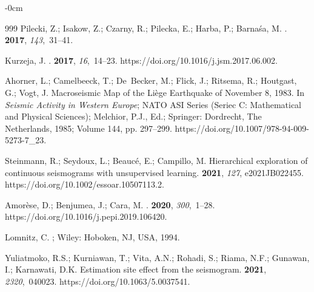 \documentclass[sensors,article,accept,moreauthors,pdftex]{Definitions/mdpi}
\begin{document}
\begin{adjustwidth}{-\extralength}{0cm}
\begin{thebibliography}{999}
Pilecki, Z.; Isakow, Z.; Czarny, R.; Pilecka, E.; Harba, P.; Barnaśa, M.
.
 {\bf 2017}, {\em 143},~31--41.

Kurzeja, J.
.
 {\bf 2017}, {\em 16},~14--23.
\newblock
  {https://doi.org/10.1016/j.jsm.2017.06.002}.

Ahorner, L.; Camelbeeck, T.; De~Becker, M.; Flick, J.; Ritsema, R.; Houtgast,
  G.; Vogt, J.
\newblock Macroseismic Map of the Liège Earthquake of November 8, 1983. In
  {\em Seismic Activity in Western Europe}; NATO ASI Series (Seriec C:
  Mathematical and Physical Sciences); Melchior, P.J., Ed.; Springer:
  Dordrecht, The Netherlands,  1985; Volume 144, pp. 297--299.
\newblock
{https://doi.org/10.1007/978-94-009-5273-7\_23}.

Steinmann, R.; Seydoux, L.; Beaucé, E.; Campillo, M.
\newblock Hierarchical exploration of continuous seismograms with unsupervised
  learning.
 {\bf 2021}, \emph{127}, e2021JB022455. %
\newblock
{https://doi.org/10.1002/essoar.10507113.2}.

Amorèse, D.; Benjumea, J.; Cara, M.
.
 {\bf 2020}, {\em
  300},~1--28.
\newblock
{https://doi.org/10.1016/j.pepi.2019.106420}.

Lomnitz, C.
; Wiley: Hoboken, NJ, USA, %
  1994.

Yuliatmoko, R.S.; Kurniawan, T.; Vita, A.N.; Rohadi, S.; Riama, N.F.; Gunawan,
  I.; Karnawati, D.K.
\newblock Estimation site effect from the seismogram.
 {\bf 2021}, {\em 2320},~040023.
\newblock
 {https://doi.org/10.1063/5.0037541}.


\end{thebibliography}
\end{adjustwidth}
\end{document}
